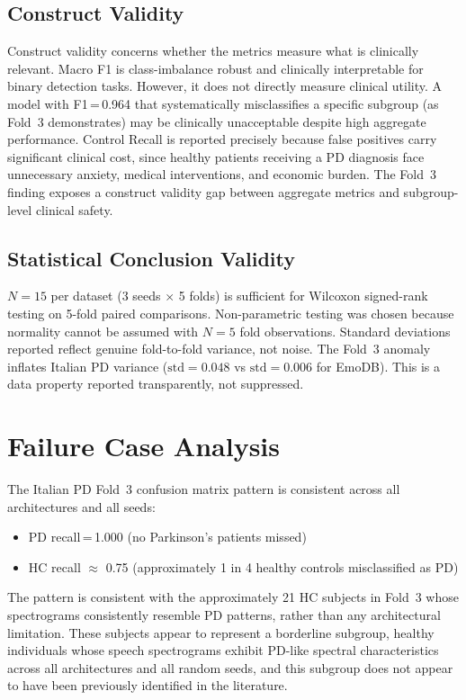 \documentclass[oneside,openany]{final_report}
\begin{document}
\subsection{Construct Validity}

Construct validity concerns whether the metrics measure what is clinically relevant. Macro F1 is class-imbalance robust and clinically interpretable for binary detection tasks. However, it does not directly measure clinical utility. A model with F1\,=\,0.964 that systematically misclassifies a specific subgroup (as Fold~3 demonstrates) may be clinically unacceptable despite high aggregate performance. Control Recall is reported precisely because false positives carry significant clinical cost, since healthy patients receiving a PD diagnosis face unnecessary anxiety, medical interventions, and economic burden. The Fold~3 finding exposes a construct validity gap between aggregate metrics and subgroup-level clinical safety.

\subsection{Statistical Conclusion Validity}

$N\!=\!15$ per dataset (3 seeds $\times$ 5 folds) is sufficient for Wilcoxon signed-rank testing on 5-fold paired comparisons. Non-parametric testing was chosen because normality cannot be assumed with $N\!=\!5$ fold observations. Standard deviations reported reflect genuine fold-to-fold variance, not noise. The Fold~3 anomaly inflates Italian PD variance ($\text{std}\!=\!0.048$ vs $\text{std}\!=\!0.006$ for EmoDB). This is a data property reported transparently, not suppressed.

\section{Failure Case Analysis}

The Italian PD Fold~3 confusion matrix pattern is consistent across all architectures and all seeds:

\begin{itemize}[nosep]
    \item PD recall\,=\,1.000 (no Parkinson's patients missed)
    \item HC recall $\approx$ 0.75 (approximately 1 in 4 healthy controls misclassified as PD)
\end{itemize}

The pattern is consistent with the approximately 21 HC subjects in Fold~3 whose spectrograms consistently resemble PD patterns, rather than any architectural limitation. These subjects appear to represent a borderline subgroup, healthy individuals whose speech spectrograms exhibit PD-like spectral characteristics across all architectures and all random seeds, and this subgroup does not appear to have been previously identified in the literature.
\end{document}
